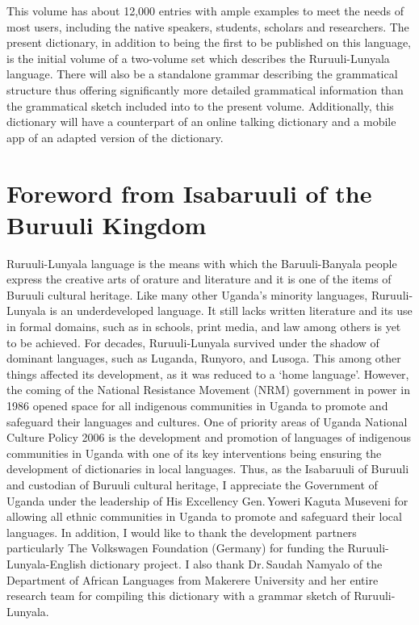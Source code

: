 This volume has about 12,000 entries with ample examples to meet the needs of most users, including the native speakers, students, scholars and researchers. 
The present dictionary, in addition to being the first to be published on this language, is the initial volume of a two-volume set which describes the Ru\-ruu\-li\hyp{}Lu\-nya\-la language.  
There will also be a standalone grammar describing the grammatical structure thus offering significantly more detailed grammatical information than the grammatical sketch included into to the present volume. 
Additionally, this dictionary will have a counterpart of an online talking dictionary and a mobile app of an adapted version of the dictionary. 


\section*{Foreword from Isabaruuli of the Buruuli Kingdom}\label{sec-foreword-1}

Ruruuli-Lunyala language is the means with which the Baruuli-Banyala people express the creative arts of orature and literature and it is one of the items of Buruuli cultural heritage. Like many other Uganda’s minority languages, Ru\-ruu\-li\hyp{}Lu\-nya\-la is an underdeveloped language. It still lacks written literature and its use in formal domains, such as in schools, print media, and law among others is yet to be achieved. For decades, Ru\-ruu\-li\hyp{}Lu\-nya\-la survived under the shadow of dominant languages, such as Luganda, Runyoro, and Lusoga. 
This among other things affected its development, as it was reduced to a ‘home language’. 
However, the coming of the National Resistance Movement (NRM) government in power in 1986 opened space for all indigenous communities in Uganda to promote and safeguard their languages and cultures. 
One of priority areas of Uganda National Culture Policy 2006 is the development and promotion of languages of indigenous communities in Uganda with one of its key interventions being ensuring the development of dictionaries in local languages. 
Thus, as the Isabaruuli of Buruuli and custodian of Buruuli cultural heritage, I appreciate the Government of Uganda under the leadership of His Excellency Gen.\,Yoweri Kaguta Museveni for allowing all ethnic communities in Uganda to promote and safeguard their local languages. 
In addition, I would like to thank the development partners particularly The Volkswagen Foundation (Germany) for funding the Ru\-ruu\-li\hyp{}Lu\-nya\-la-English dictionary project.  
I also thank Dr.\,Saudah Namyalo of the Department of African Languages from Makerere University and her entire research team for compiling this dictionary with a grammar sketch of Ru\-ruu\-li\hyp{}Lu\-nya\-la. 

